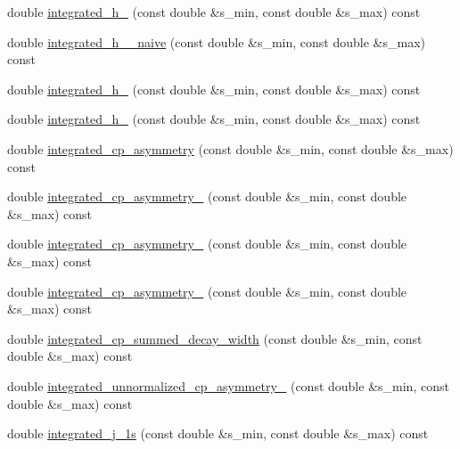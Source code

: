 \begin{DoxyCompactItemize}
\item 
double \hyperlink{classeos_1_1BToKstarDilepton_3_01LowRecoil_01_4_a635c2a461565e3da3567758e05411d49}{integrated\_\-h\_} (const double \&s\_\-min, const double \&s\_\-max) const 
\item 
double \hyperlink{classeos_1_1BToKstarDilepton_3_01LowRecoil_01_4_a24cdee87f3e6388061dd8f62a32489d5}{integrated\_\-h\_\_\-naive} (const double \&s\_\-min, const double \&s\_\-max) const 
\item 
double \hyperlink{classeos_1_1BToKstarDilepton_3_01LowRecoil_01_4_a14f75e87e86274e5f7b28039f9bd6b5c}{integrated\_\-h\_} (const double \&s\_\-min, const double \&s\_\-max) const 
\item 
double \hyperlink{classeos_1_1BToKstarDilepton_3_01LowRecoil_01_4_a5ee3c88bdfccb58ee217b79aa947c4b4}{integrated\_\-h\_} (const double \&s\_\-min, const double \&s\_\-max) const 
\item 
double \hyperlink{classeos_1_1BToKstarDilepton_3_01LowRecoil_01_4_aca800290e1d89caca0f03adc7b77f476}{integrated\_\-cp\_\-asymmetry} (const double \&s\_\-min, const double \&s\_\-max) const 
\item 
double \hyperlink{classeos_1_1BToKstarDilepton_3_01LowRecoil_01_4_a087f366b330084ec2b2476aee279ba18}{integrated\_\-cp\_\-asymmetry\_} (const double \&s\_\-min, const double \&s\_\-max) const 
\item 
double \hyperlink{classeos_1_1BToKstarDilepton_3_01LowRecoil_01_4_a5c84df702d00df7affbc7c597f55f6f3}{integrated\_\-cp\_\-asymmetry\_} (const double \&s\_\-min, const double \&s\_\-max) const 
\item 
double \hyperlink{classeos_1_1BToKstarDilepton_3_01LowRecoil_01_4_ad4a173a76138ee816326a381ec1946d8}{integrated\_\-cp\_\-asymmetry\_} (const double \&s\_\-min, const double \&s\_\-max) const 
\item 
double \hyperlink{classeos_1_1BToKstarDilepton_3_01LowRecoil_01_4_a0dc18658255a6b4bd15c91bd99020a57}{integrated\_\-cp\_\-summed\_\-decay\_\-width} (const double \&s\_\-min, const double \&s\_\-max) const 
\item 
double \hyperlink{classeos_1_1BToKstarDilepton_3_01LowRecoil_01_4_a239381fa63ad8dc532e1048f592a57f8}{integrated\_\-unnormalized\_\-cp\_\-asymmetry\_} (const double \&s\_\-min, const double \&s\_\-max) const 
\item 
double \hyperlink{classeos_1_1BToKstarDilepton_3_01LowRecoil_01_4_a7c4175068b4058ae02f5bf6c75106e45}{integrated\_\-j\_\-1s} (const double \&s\_\-min, const double \&s\_\-max) const 

\end{DoxyCompactItemize}
